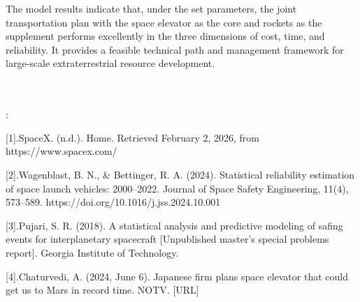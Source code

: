 \documentclass{article}
\begin{document}
The model results indicate that, under the set parameters, the joint transportation plan with the space elevator as the core and rockets as the supplement performs excellently in the three dimensions of cost, time, and reliability. It provides a feasible technical path and management framework for large-scale extraterrestrial resource development.




\\
\\
[Quotation]:

[1].SpaceX. (n.d.). Home. Retrieved February 2, 2026, from https://www.spacex.com/

[2].Wagenblast, B. N., \& Bettinger, R. A. (2024). Statistical reliability estimation of space launch vehicles: 2000–2022. Journal of Space Safety Engineering, 11(4), 573–589.
https://doi.org/10.1016/j.jss.2024.10.001

[3].Pujari, S. R. (2018). A statistical analysis and predictive modeling of safing events for interplanetary spacecraft [Unpublished master’s special problems report]. Georgia Institute of Technology.

[4].Chaturvedi, A. (2024, June 6). Japanese firm plans space elevator that could get us to Mars in record time. NOTV. [URL]
\end{document}
